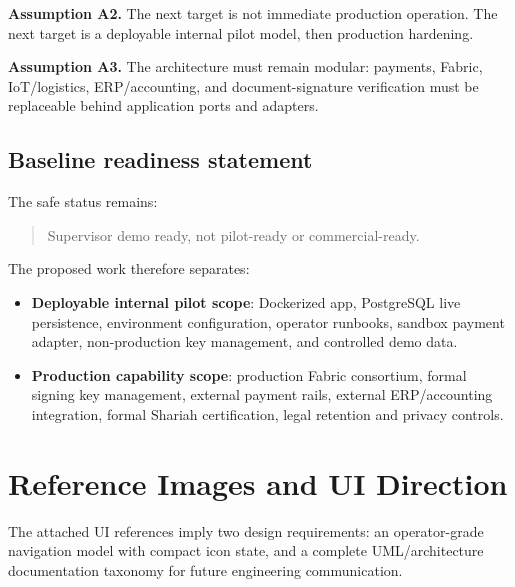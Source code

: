 \documentclass[11pt]{article}
\begin{document}
\textbf{Assumption A2.} The next target is not immediate production operation. The next target is a deployable internal pilot model, then production hardening.

\textbf{Assumption A3.} The architecture must remain modular: payments, Fabric, IoT/logistics, ERP/accounting, and document-signature verification must be replaceable behind application ports and adapters.

\subsection{Baseline readiness statement}
The safe status remains:

\begin{quote}
Supervisor demo ready, not pilot-ready or commercial-ready.
\end{quote}

The proposed work therefore separates:

\begin{itemize}
  \item \textbf{Deployable internal pilot scope}: Dockerized app, PostgreSQL live persistence, environment configuration, operator runbooks, sandbox payment adapter, non-production key management, and controlled demo data.
  \item \textbf{Production capability scope}: production Fabric consortium, formal signing key management, external payment rails, external ERP/accounting integration, formal Shariah certification, legal retention and privacy controls.
\end{itemize}

\section{Reference Images and UI Direction}

The attached UI references imply two design requirements: an operator-grade navigation model with compact icon state, and a complete UML/architecture documentation taxonomy for future engineering communication.
\end{document}
